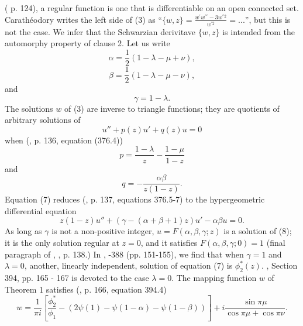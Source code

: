 \documentclass{article}
\begin{document}
(\cite{caratheodory1} p. 124),
a regular function is one that is
differentiable 
on an open connected set.
Carath{\'e}odory writes the left side
of (3) as 
``$\{w,z\} = \frac{w^{'}w^{'''} - 
3 w^{''2}}{w^{'2}} = ...$'', 
but this is not the case.
We infer that the Schwarzian derivitave $\{w,z\}$ 
is intended
from the automorphy property of clause 2.
\newline \newline \noindent
Let us write
\begin{equation}
\alpha = \frac 12
(1 - \lambda - \mu + \nu),
\end{equation}
\begin{equation}
\beta = \frac 12(1-\lambda - \mu - \nu),
\end{equation}
and
\begin{equation}
\gamma = 1 - \lambda.
\end{equation}
The solutions $w$ of (3)
are inverse to triangle functions;
they are quotients of 
arbitrary solutions of
\begin{equation}
u'' + p(z)u' +q(z)u = 0
\end{equation}
when (\cite{caratheodory2}, 
p. 136, equation (376.4))
 $$
 p = \frac {1-\lambda}z-\frac {1-\mu}{1-z}
 $$
 and
 $$
 q = - \frac {\alpha \beta}{z(1-z)}.
 $$
Equation (7) reduces (\cite{caratheodory2}, p. 137, 
equations 376.5-7)
to the 
hypergeometric differential
equation 
\begin{equation}
z(1-z)u'' +(\gamma - (\alpha + \beta +1)z)u'
- \alpha \beta u = 0.
\end{equation}
As long as $\gamma$ is not a
non-positive integer, 
$u=F(\alpha,\beta,\gamma;z)$
is a solution of (8); it is 
the only solution
regular at $z = 0$, and it
satisfies 
$F(\alpha,\beta,\gamma;0) = 1$
(final paragraph of 
\cite{caratheodory2}, , 
p. 138.) 
 \newline \newline \noindent
 In  \cite{caratheodory2},
\textsection {}-388 
(pp. 151-155), we find that
when $\gamma = 1$
and $\lambda = 0$,
 another, linearly independent,
solution of equation (7) is $\phi_2^*(z)$.
\cite{caratheodory2}, Section 394, pp. 165 - 167 
 is 
devoted to the
case $\lambda = 0$. 
The mapping 
function $w$ of Theorem 1 
satisfies (\cite{caratheodory2}, 
p. 166,  equation 394.4)
\begin{equation}
 w = \frac 1{\pi i}
 \left [ \frac{\phi_2^*}{\phi_1} -
\left (2 \psi(1) - 
\psi(1 - \alpha)
- \psi(1-\beta) \right ) \right ] + 
i \frac{ \sin \pi \mu}
{\cos \pi \mu + \cos \pi \nu}.
\end{equation}
\end{document}
